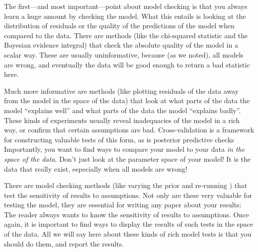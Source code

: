 \documentclass[modern]{aastex61}
\newcommand{\MCMC}{\acronym{MCMC}}
\begin{document}
The first---and most important---point about model checking is that
you always learn a huge amount by checking the model.
What this entails is looking at the distribution of residuals or the
quality of the predictions of the model when compared to the data.
There are methods (like the chi-squared statistic and the Bayesian
evidence integral) that check the absolute quality of the model in a
scalar way.
These are usually uninformative, because (as we noted), all models are
wrong, and eventually the data will be good enough to return a bad
statistic here.

Much more informative are methods (like plotting residuals of the data
away from the model in the space of the data) that look at what parts
of the data the model ``explains well'' and what parts of the data the
model ``explains badly''.
These kinds of experiments usually reveal inadequacies of the model in
a rich way, or confirm that certain assumptions are bad.
Cross-validation
is a framework for constructing
valuable tests of this form, as is posterior predictive checks
Importantly, you want to find ways to compare your model to your data
\emph{in the space of the data}.
Don't just look at the parameter space of your model!
It is the data that really exist, especially when all models are wrong!

There are model checking methods (like varying the prior and
re-running \MCMC) that test the sensitivity of results to assumptions.
Not only are these very valuable for testing the model, they are
essential for writing any paper about your results: The reader always
wants to know the sensitivity of results to assumptions.
Once again, it is important to find ways to display the results of
such tests in the space of the data.
All we will say here about these kinds of rich model tests is that you
should do them, and report the results.
\end{document}
